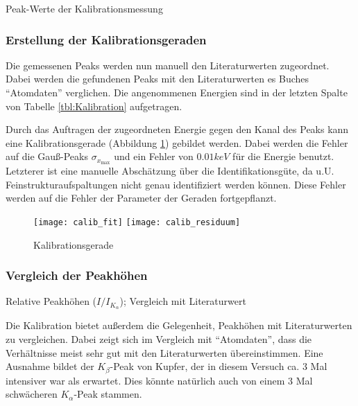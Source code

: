 \documentclass{../Misc/MontavonLaTeX/Montavon}
\newcommand{\halfwidth}{0.48\textwidth}
\begin{document}
\begin{table}[htbp]
\centering
\small
\makebox[\textwidth][c]{}
\caption{Peak-Werte der Kalibrationsmessung}
\label{tbl:Kalibration}
\end{table}


\subsubsection{Erstellung der Kalibrationsgeraden}
Die gemessenen Peaks werden nun manuell den Literaturwerten zugeordnet. Dabei werden die gefundenen Peaks mit den Literaturwerten es Buches \enquote{Atomdaten}\cite{atomdaten} verglichen. 
Die angenommenen Energien sind in der letzten Spalte von Tabelle \ref{tbl:Kalibration} aufgetragen.

Durch das Auftragen der zugeordneten Energie gegen den Kanal des Peaks kann eine Kalibrationsgerade (Abbildung \ref{fig:Kalibrationsgerade}) gebildet werden. Dabei werden die Fehler auf die Gauß-Peaks $\sigma_{x_\textrm{max}}$ und ein Fehler von $0.01 \unit{keV}$ für die Energie benutzt. Letzterer ist eine manuelle Abschätzung über die Identifikationsgüte, da u.U. Feinstrukturaufspaltungen nicht genau identifiziert werden können.
Diese Fehler werden auf die Fehler der Parameter der Geraden fortgepflanzt.

\begin{figure}[htbp]
\centering
\texttt{[image: calib\_fit]}
\texttt{[image: calib\_residuum]}
\caption{Kalibrationsgerade}
\label{fig:Kalibrationsgerade}
\end{figure}

%

\subsubsection{Vergleich der Peakhöhen}

\begin{table}[htbp]
\centering

\caption{Relative Peakhöhen ($I/I_{K_\alpha}$); Vergleich mit Literaturwert\cite{atomdaten}}
\end{table}

Die Kalibration bietet außerdem die Gelegenheit, Peakhöhen mit Literaturwerten zu vergleichen. Dabei zeigt sich im Vergleich mit \enquote{Atomdaten}\cite{atomdaten}, dass die Verhältnisse meist sehr gut mit den Literaturwerten übereinstimmen. 
Eine Ausnahme bildet der $K_\beta$-Peak von Kupfer, der in diesem Versuch ca. 3 Mal intensiver war als erwartet. Dies könnte natürlich auch von einem 3 Mal schwächeren $K_\alpha$-Peak stammen.
\end{document}
